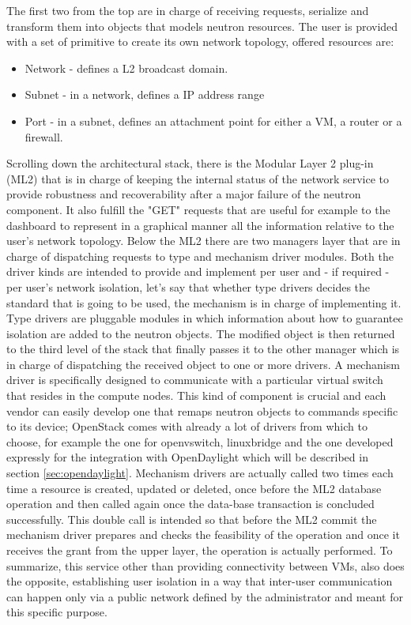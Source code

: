 The first two from the top are in charge of receiving requests, serialize and transform them into objects that models neutron resources.
The user is provided with a set of primitive to create its own network topology, offered resources are:
\begin{itemize}
\label{neutronresourcelist}
    \item Network - defines a L2 broadcast domain.
    \item Subnet - in a network, defines a IP address range
    \item Port - in a subnet, defines an attachment point for either a VM, a router or a firewall.
\end{itemize}
Scrolling down the architectural stack, there is the Modular Layer 2 plug-in (ML2) that is in charge of keeping the internal status of the network service to provide robustness and recoverability after a major failure of the neutron component. It also fulfill the "GET" requests that are useful for example to the dashboard to represent in a graphical manner all the information relative to the user's network topology.
Below the ML2 there are two managers layer that are in charge of dispatching requests to type and mechanism driver modules.
Both the driver kinds are intended to provide and implement per user and - if required - per user's network isolation, let's say that whether type drivers decides the standard that is going to be used, the mechanism is in charge of implementing it.
Type drivers are pluggable modules in which information about how to guarantee isolation are added to the neutron objects. The modified object is then returned to the third level of the stack that finally passes it to the other manager which is in charge of dispatching the received object to one or more drivers.
A mechanism driver is specifically designed to communicate with a particular virtual switch that resides in the compute nodes. This kind of component is crucial and each vendor can easily develop one that remaps neutron objects to commands specific to its device; OpenStack comes with already a lot of drivers from which to choose, for example the one for openvswitch, linuxbridge and the one developed expressly for the integration with OpenDaylight which will be described in section \ref{sec:opendaylight}.
Mechanism drivers are actually called two times each time a resource is created, updated or deleted, once before the ML2 database operation and then called again once the data-base transaction is concluded successfully.
This double call is intended so that before the ML2 commit the mechanism driver prepares and checks the feasibility of the operation and once it receives the grant from the upper layer, the operation is actually performed.
To summarize, this service other than providing connectivity between VMs, also does the opposite, establishing user isolation in a way that inter-user communication can happen only via a public network defined by the administrator and meant for this specific purpose.


